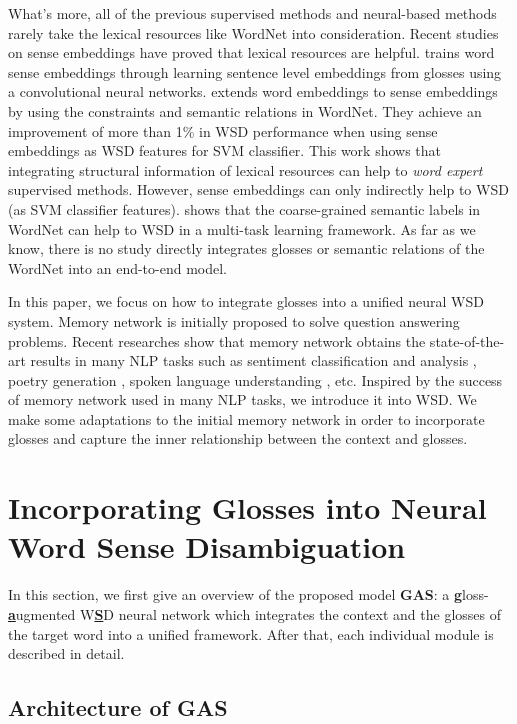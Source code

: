 \documentclass[11pt,a4paper]{article}
\begin{document}
What's more, all of the previous supervised methods and neural-based methods rarely take the lexical resources like WordNet \cite{fellbaum1998wordnet} into consideration.
Recent studies on sense embeddings have proved that lexical resources are helpful.
\citet{Chen2015Improving} trains word sense embeddings through learning sentence level embeddings from glosses using a convolutional neural networks.
\citet{rothe2015autoextend} extends word embeddings to sense embeddings by using the constraints and semantic relations in WordNet.
They achieve an improvement of more than 1\% in WSD performance when using sense embeddings as WSD features for SVM classifier.
This work shows that integrating structural information of lexical resources can help to {\em word expert} supervised methods.
However, sense embeddings can only indirectly help to WSD (as SVM classifier features).
\citet{Raganato2017} shows that the coarse-grained semantic labels in WordNet can help to WSD in a multi-task learning framework.
As far as we know, there is no study directly integrates glosses or semantic relations of the WordNet into an end-to-end model.


In this paper, we focus on how to integrate glosses into a unified neural WSD system.
Memory network \cite{sukhbaatar2015MN,kumar2016dmn,xiong2016dnn1} is initially proposed to solve question answering problems.
Recent researches show that memory network obtains the state-of-the-art results in many NLP tasks such as sentiment
classification \cite{Li2017End} and analysis \cite{gui2017question}, poetry generation \cite{Zhang2017Flexible}, spoken language understanding \cite{Chen2016End}, etc.
Inspired by the success of memory network used in many NLP tasks, we introduce it into WSD.
We make some adaptations to the initial memory network in order to incorporate glosses and capture the inner relationship between the context and glosses.




\section{Incorporating Glosses into Neural Word Sense Disambiguation} \label{sec:WSDMN}
In this section, we first give an overview of the proposed model \textbf{GAS}: a \uline{\bf g}loss-\uline{\bf a}ugmented W\uline{\bf S}D neural network
which integrates the context and the glosses of the target word into a unified framework.
After that, each individual module is described in detail.

\subsection{Architecture of GAS} \label{subsec:DNN}
\end{document}
